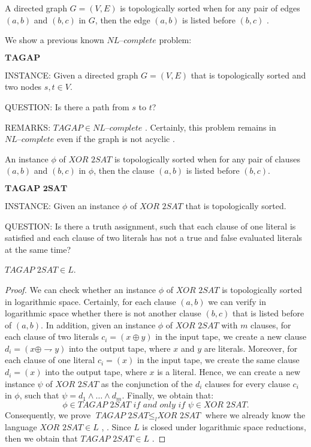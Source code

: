 \documentclass[a4paper,UKenglish,cleveref, autoref]{lipics-v2019}
\begin{document}
A directed graph $G = (V, E)$ is topologically sorted when for any pair of edges $(a, b)$ and $(b, c)$ in $G$, then the edge $(a, b)$ is listed before $(b, c)$ \cite{HM81}.

We show a previous known $\textit{NL--complete}$ problem:

\begin{definition}
$\textbf{TAGAP}$

INSTANCE: Given a directed graph $G = (V, E)$ that is topologically sorted and two nodes $s, t \in V$.

QUESTION: Is there a path from $s$ to $t$?

REMARKS: $TAGAP \in \textit{NL--complete}$ \cite{HM81}. Certainly, this problem remains in $\textit{NL--complete}$ even if the graph is not acyclic \cite{HM81}. 
\end{definition}

\begin{definition}
An instance $\phi$ of $\textit{XOR 2SAT}$ is topologically sorted when for any pair of clauses $(a, b)$ and $(b, c)$ in $\phi$, then the clause $(a, b)$ is listed before $(b, c)$.
\end{definition}

\begin{definition}
$\textbf{TAGAP 2SAT}$

INSTANCE: Given an instance $\phi$ of $\textit{XOR 2SAT}$ that is topologically sorted.

QUESTION: Is there a truth assignment, such that each clause of one literal is satisfied and each clause of two literals has not a true and false evaluated literals at the same time?
\end{definition}

\begin{theorem}
$\textit{TAGAP 2SAT} \in L$.
\end{theorem}

\begin{proof}
We can check whether an instance $\phi$ of $\textit{XOR 2SAT}$ is topologically sorted in logarithmic space. Certainly, for each clause $(a, b)$ we can verify in logarithmic space whether there is not another clause $(b, c)$ that is listed before of $(a, b)$. In addition, given an instance $\phi$ of $\textit{XOR 2SAT}$ with $m$ clauses, for each clause of two literals $c_{i} = (x \oplus y)$ in the input tape, we create a new clause $d_{i} = (x \oplus \rightharpoondown y)$ into the output tape, where $x$ and $y$ are literals. Moreover, for each clause of one literal $c_{i} = (x)$ in the input tape, we create the same clause $d_{i} = (x)$ into the output tape, where $x$ is a literal. Hence, we can create a new instance $\psi$ of $\textit{XOR 2SAT}$ as the conjunction of the $d_{i}$ clauses for every clause $c_{i}$ in $\phi$, such that $\psi = d_{1} \wedge \ldots \wedge d_{m}$. Finally, we obtain that:
\[\phi \in \textit{TAGAP 2SAT} \textit{ if and only if } \psi \in \textit{XOR 2SAT}.\]
Consequently, we prove $\textit{TAGAP 2SAT} \leq_{l} \textit{XOR 2SAT}$ where we already know the language $\textit{XOR 2SAT} \in L$ \cite{AR00}, \cite{RM08}. Since $L$ is closed under logarithmic space reductions, then we obtain that $\textit{TAGAP 2SAT} \in L$ \cite{Pap03}.
\end{proof}
\end{document}
